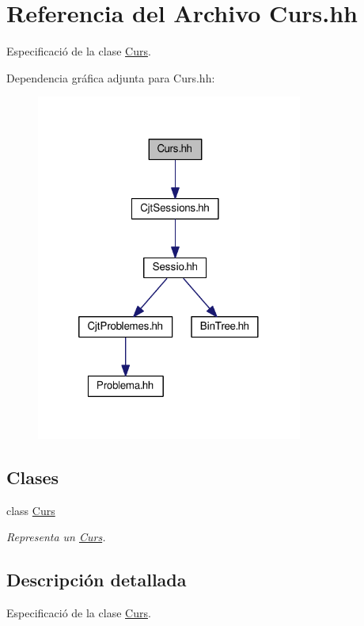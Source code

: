 \hypertarget{_curs_8hh}{}\section{Referencia del Archivo Curs.\+hh}
\label{_curs_8hh}


Especificació de la clase \mbox{\hyperlink{class_curs}{Curs}}.  


Dependencia gráfica adjunta para Curs.\+hh\+:\nopagebreak
\begin{figure}[H]
\begin{center}
\leavevmode
\includegraphics[width=248pt]{_curs_8hh__incl}
\end{center}
\end{figure}
\subsection*{Clases}
\begin{DoxyCompactItemize}
\item 
class \mbox{\hyperlink{class_curs}{Curs}}
\begin{DoxyCompactList}\small\item\em Representa un \mbox{\hyperlink{class_curs}{Curs}}. \end{DoxyCompactList}\end{DoxyCompactItemize}


\subsection{Descripción detallada}
Especificació de la clase \mbox{\hyperlink{class_curs}{Curs}}. 


